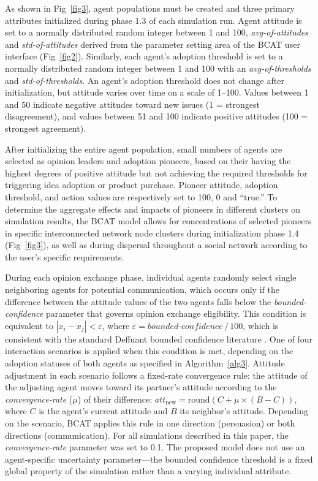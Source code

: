 \documentclass[10pt,letterpaper]{article}
\begin{document}
As shown in Fig~\ref{fig3}, agent populations must be created and three primary attributes initialized during phase 1.3 of each simulation run. Agent attitude is set to a normally distributed random integer between 1 and 100, \textit{avg-of-attitudes} and \textit{std-of-attitudes} derived from the parameter setting area of the BCAT user interface (Fig~\ref{fig2}). Similarly, each agent's adoption threshold is set to a normally distributed random integer between 1 and 100 with an \textit{avg-of-thresholds} and \textit{std-of-thresholds}. An agent's adoption threshold does not change after initialization, but attitude varies over time on a scale of 1--100. Values between 1 and 50 indicate negative attitudes toward new issues (1 = strongest disagreement), and values between 51 and 100 indicate positive attitudes (100 = strongest agreement).

After initializing the entire agent population, small numbers of agents are selected as opinion leaders and adoption pioneers, based on their having the highest degrees of positive attitude but not achieving the required thresholds for triggering idea adoption or product purchase. Pioneer attitude, adoption threshold, and action values are respectively set to 100, 0 and ``true.'' To determine the aggregate effects and impacts of pioneers in different clusters on simulation results, the BCAT model allows for concentrations of selected pioneers in specific interconnected network node clusters during initialization phase 1.4 (Fig~\ref{fig3}), as well as during dispersal throughout a social network according to the user's specific requirements.

During each opinion exchange phase, individual agents randomly select single neighboring agents for potential communication, which occurs only if the difference between the attitude values of the two agents falls below the \textit{bounded-confidence} parameter that governs opinion exchange eligibility. This condition is equivalent to $|x_i - x_j| < \varepsilon$, where $\varepsilon = \textit{bounded-confidence}\,/\,100$, which is consistent with the standard Deffuant bounded confidence literature \cite{Deffuant2000}. One of four interaction scenarios is applied when this condition is met, depending on the adoption statuses of both agents as specified in Algorithm~\ref{alg3}. Attitude adjustment in each scenario follows a fixed-rate convergence rule: the attitude of the adjusting agent moves toward its partner's attitude according to the \textit{convergence-rate} ($\mu$) of their difference: $\textit{att}_{\text{new}} = \text{round}(C + \mu \times (B - C))$, where $C$ is the agent's current attitude and $B$ its neighbor's attitude. Depending on the scenario, BCAT applies this rule in one direction (persuasion) or both directions (communication). For all simulations described in this paper, the \textit{convergence-rate} parameter was set to 0.1. The proposed model does not use an agent-specific uncertainty parameter---the bounded confidence threshold is a fixed global property of the simulation rather than a varying individual attribute.
\end{document}
